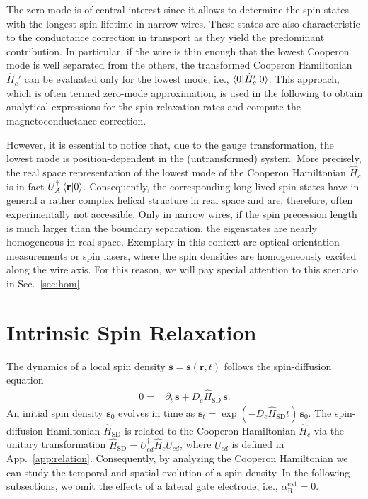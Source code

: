 \documentclass[superscriptaddress,noshowpacs,noshowkeys, twocolumn, floatfix,aps, prb,reprint]{revtex4-1}
\begin{document}
The zero-mode is of central interest since it allows to determine the spin states with the longest spin lifetime in narrow wires.
These states are also characteristic to the conductance correction in transport as they yield the predominant contribution.
In particular, if the wire is thin enough that the lowest Cooperon mode is well separated from the others, the transformed Cooperon Hamiltonian $\hat{H}_c'$ can be evaluated only for the lowest mode, i.e., $\braket{0|\hat{H}_c'|0}$.
This approach, which is often termed zero-mode approximation,\cite{Aleiner2001,Meyer2002,Kettemann2007a} is used in the following to obtain analytical expressions for the spin relaxation rates and compute the magnetoconductance correction.

However, it is essential to notice that, due to the gauge transformation, the lowest mode is position-dependent in the (untransformed) system.
More precisely, the real space representation of the lowest mode of the  Cooperon Hamiltonian $\hat{H}_c$ is in fact $U_A^\dag \braket{\mathbf{r}|0}$.
Consequently, the corresponding long-lived spin states have in general a rather complex helical structure in real space and are, therefore, often experimentally not accessible.
Only in narrow wires, if the spin precession length is much larger than the boundary separation, the eigenstates are nearly homogeneous in real space.
Exemplary in this context are optical orientation measurements or spin lasers, where the spin densities are homogeneously excited along the wire axis.\cite{Furthmeier2016,FariaJunior2015,FariaJunior2017}
For this reason, we will pay special attention to this scenario in Sec.~\ref{sec:hom}.


\section{Intrinsic Spin Relaxation}\label{sec:intr_spin_relax}

The dynamics of a local spin density $\mathbf{s}=\mathbf{s}(\mathbf{r},t)$ follows the spin-diffusion equation\cite{Wenk2010}
%
\begin{align}
0={}&\partial_t\, \mathbf{s}+D_e \hat{H}_\text{SD}\,  \mathbf{s}.
\label{eq:spindiff_eq}
\end{align}
%
An initial spin density $\mathbf{s}_0$ evolves in time as ${\mathbf{s}_t=\exp(-D_e \hat{H}_\text{SD}t)\,\mathbf{s}_0}$.
The spin-diffusion Hamiltonian $\hat{H}_\text{SD}$ is related to the Cooperon Hamiltonian $\hat{H}_c$ via the unitary transformation $\hat{H}_\text{SD}=U_{cd}^\dag \hat{H}_c U_{cd}$, where $U_{cd}$ is defined in App.~\ref{app:relation}.
Consequently, by analyzing the Cooperon Hamiltonian we can study the temporal and spatial evolution of a spin density.
In the following subsections, we omit the effects of a lateral gate electrode, i.e., $\alpha_\text{R}^\text{ext}=0$.
\end{document}
